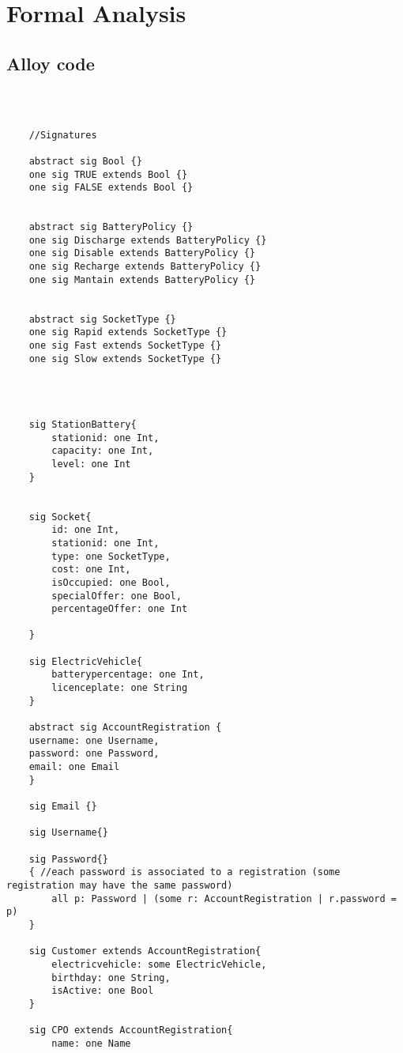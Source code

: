 \section{Formal Analysis}
\subsection{Alloy code}


\begin{lstlisting}[language=alloy]
    
    

    //Signatures

    abstract sig Bool {}
    one sig TRUE extends Bool {}
    one sig FALSE extends Bool {}


    abstract sig BatteryPolicy {}
    one sig Discharge extends BatteryPolicy {}
    one sig Disable extends BatteryPolicy {}
    one sig Recharge extends BatteryPolicy {}
    one sig Mantain extends BatteryPolicy {}


    abstract sig SocketType {}
    one sig Rapid extends SocketType {}
    one sig Fast extends SocketType {}
    one sig Slow extends SocketType {}


    

    sig StationBattery{
        stationid: one Int,
        capacity: one Int,
        level: one Int
    }


    sig Socket{
        id: one Int,
        stationid: one Int,
        type: one SocketType,
        cost: one Int,
        isOccupied: one Bool,
        specialOffer: one Bool,
        percentageOffer: one Int

    }
    
    sig ElectricVehicle{
        batterypercentage: one Int,
        licenceplate: one String
    }

    abstract sig AccountRegistration {
    username: one Username,
    password: one Password,
    email: one Email
    }

    sig Email {}

    sig Username{}

    sig Password{}
    { //each password is associated to a registration (some registration may have the same password)
        all p: Password | (some r: AccountRegistration | r.password = p)
    }

    sig Customer extends AccountRegistration{
	    electricvehicle: some ElectricVehicle,
	    birthday: one String,
	    isActive: one Bool
    }

    sig CPO extends AccountRegistration{
	    name: one Name
	    

\end{lstlisting}
